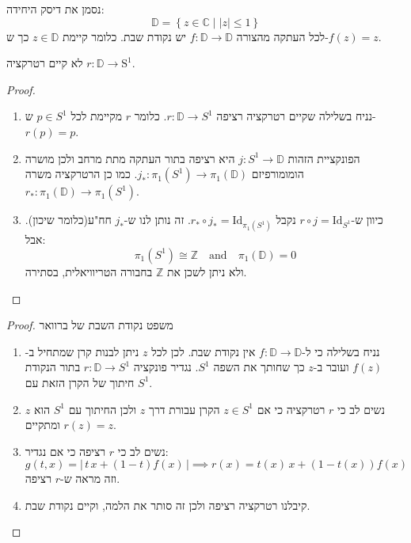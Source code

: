 \documentclass{tstextbook}
\begin{document}
\begin{theorem}
נסמן את דיסק היחידה:
$$\mathbb{D} = \left\{  z \in \mathbb{C} \mid \lvert z \rvert \leq 1 \right\}$$
לכל העתקה מהצורה \(f:\mathbb{D}\to \mathbb{D}\) יש נקודת שבת. כלומר קיימת \(z \in \mathbb{D}\) כך ש-\(f(z)=z\).

\end{theorem}
\begin{lemma}
לא קיים רטרקציה \(r:\mathbb{D}\to \mathrm{S^{1}}\).

\end{lemma}
\begin{proof}
  \begin{enumerate}
    \item נניח בשלילה שקיים רטרקציה רציפה \(r:\mathbb{D}\to S^{1}\). כלומר \(r\) מקיימת לכל \(p \in S^{1}\) ש-\(r(p)=p\). 


    \item הפונקציית הזהות \(j:S^{1}\to \mathbb{D}\) היא רציפה בתור העתקה מתת מרחב ולכן מושרה הומומורפיזם \(j_{*}:\pi_{1}(S^{1})\to \pi_{1}\left( \mathbb{D} \right)\). כמו כן הרטרקציה משרה \(r_{*}:\pi_{1}\left( \mathbb{D} \right)\to\pi_{1}(S^{1})\). 


    \item כיוון ש-\(r\circ j = \mathrm{Id}_{S^{1}}\) נקבל \(r_{*}\circ j_{*}=\mathrm{Id}_{\pi_{1}(S^{1})}\). זה נותן לנו ש-\(j_{*}\) חח"ע(כלומר שיכון). אבל: 
$$\pi_{1}(S^{1})\cong\mathbb{Z}\quad{\mathrm{and}}\quad\pi_{1}({{{\mathbb{D}}}})=0$$
ולא ניתן לשכן את \(\mathbb{Z}\) בחבורה הטריוויאלית, בסתירה.


  \end{enumerate}
\end{proof}
\begin{proof}
משפט נקודת השבת של ברוואר

  \begin{enumerate}
    \item נניח בשלילה כי ל-\(f:\mathbb{D\to D}\) אין נקודת שבת. לכן לכל \(z\) ניתן לבנות קרן שמתחיל ב-\(f(z)\) ועובר ב-\(z\) כך שחותך את השפה \(S^{1}\). נגדיר פונקציה \(r:\mathbb{D}\to S^{1}\) בתור הנקודת חיתוך של הקרן הזאת עם \(S^{1}\). 


    \item נשים לב כי \(r\) רטרקציה כי אם \(z \in S^{1}\) הקרן עבורת דרך \(z\) ולכן החיתוך עם \(S^{1}\) הוא \(z\) ומתקיים \(r(z)=z\). 


    \item נשים לב כי \(r\) רציפה כי אם נגדיר: 
$$g(t,x)=|\,t\,x+(1-t)f(x)\,|\implies r(x)=t(x)\,x+(1-t(x))f(x)$$
וזה מראה ש-\(r\) רציפה.


    \item קיבלנו רטרקציה רציפה ולכן זה סותר את הלמה, וקיים נקודת שבת. 


  \end{enumerate}
\end{proof}
\end{document}
